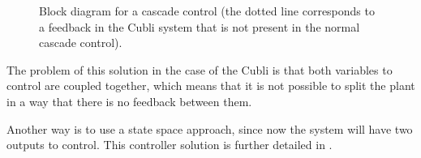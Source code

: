 \begin{figure}[H]
	
	\centering
	\caption{Block diagram for a cascade control (the dotted line corresponds to a feedback in the Cubli system that is not present in the normal cascade control).}
	\label{cascadeControl}
\end{figure}

The problem of this solution in the case of the Cubli is that both variables to control are coupled together, which means that it is not possible to split the plant in a way that there is no feedback between them.\cite{LRusso}

Another way is to use a state space approach, since now the system will have two outputs to control. This controller solution is further detailed in .

